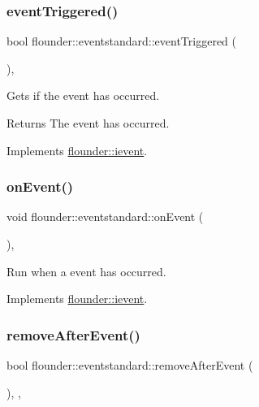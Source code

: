 \subsubsection{\texorpdfstring{event\+Triggered()}{eventTriggered()}}
{\footnotesize\ttfamily bool flounder\+::eventstandard\+::event\+Triggered (\begin{DoxyParamCaption}{ }\end{DoxyParamCaption})\hspace{0.3cm}{\ttfamily [override]}, {\ttfamily [virtual]}}



Gets if the event has occurred. 

\begin{DoxyReturn}{Returns}
The event has occurred. 
\end{DoxyReturn}


Implements \hyperlink{classflounder_1_1ievent_a4462f66feef99ef4e3521c00f4edd0c9}{flounder\+::ievent}.

\mbox{\label{classflounder_1_1eventstandard_af25e174b30e7d23698024b2c1ae9ac4c}} 
\subsubsection{\texorpdfstring{on\+Event()}{onEvent()}}
{\footnotesize\ttfamily void flounder\+::eventstandard\+::on\+Event (\begin{DoxyParamCaption}{ }\end{DoxyParamCaption})\hspace{0.3cm}{\ttfamily [override]}, {\ttfamily [virtual]}}



Run when a event has occurred. 



Implements \hyperlink{classflounder_1_1ievent_a6c6abe67435870b25eccd57a251a8992}{flounder\+::ievent}.

\mbox{\label{classflounder_1_1eventstandard_ac4b9d57605f7f81c7c7e1cb981002f2f}} 
\subsubsection{\texorpdfstring{remove\+After\+Event()}{removeAfterEvent()}}
{\footnotesize\ttfamily bool flounder\+::eventstandard\+::remove\+After\+Event (\begin{DoxyParamCaption}{ }\end{DoxyParamCaption})\hspace{0.3cm}{\ttfamily [inline]}, {\ttfamily [override]}, {\ttfamily [virtual]}}



